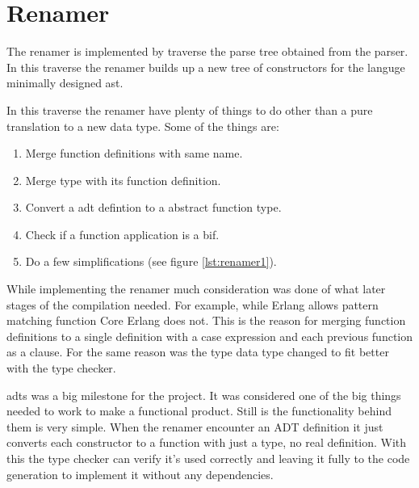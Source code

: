 \section{Renamer}


The renamer is implemented by traverse the parse tree obtained from the parser. In this traverse the renamer builds up a new tree of constructors for the languge minimally designed \acrshort{ast}. 

In this traverse the renamer have plenty of things to do other than a pure translation to a new data type. Some of the things are:

\begin{enumerate}
  \item Merge function definitions with same name.
  \item Merge type with its function definition.
  \item Convert a \acrshort{adt} defintion to a abstract function type.
  \item Check if a function application is a \acrshort{bif}.
  \item Do a few simplifications (see figure \ref{lst:renamer1}).
\end{enumerate}

While implementing the renamer much consideration was done of what later stages of the compilation needed. For example, while Erlang allows pattern matching function Core Erlang does not. This is the reason for merging function definitions to a single definition with a case expression and each previous function as a clause. For the same reason was the type data type changed to fit better with the type checker. 

\Acrlong{adt}s was a big milestone for the project. It was considered one of the big things needed to work to make a functional product. Still is the functionality behind them is very simple. When the renamer encounter an ADT definition it just converts each constructor to a function with just a type, no real definition. With this the type checker can verify it's used correctly and leaving it fully to the code generation to implement it without any dependencies. 

